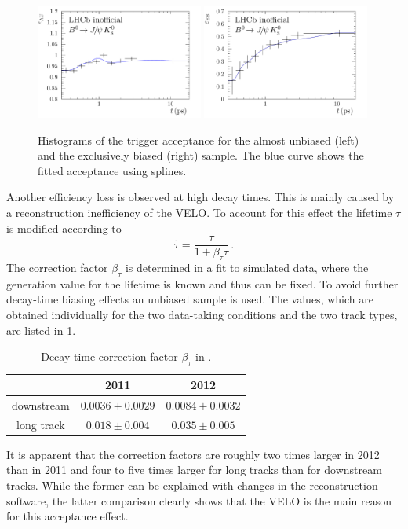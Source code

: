 \begin{figure}[htb]
\includegraphics[width=0.49\textwidth]{06-Bd2JpsiKS/tikz/pdf/Acceptancespline_zoomed_hlt2.pdf}
\includegraphics[width=0.49\textwidth]{06-Bd2JpsiKS/tikz/pdf/Acceptancespline_zoomed_hlt1.pdf}
\caption{Histograms of the trigger acceptance for the almost unbiased (left) and the
exclusively biased (right) sample. The blue curve shows the fitted acceptance
using splines.}
\label{fig:bd2jpsiks:decaytime:acceptance:splines}
\end{figure}

Another efficiency loss is observed at high decay times. This is mainly caused
by a reconstruction inefficiency of the VELO. To account for this effect the
lifetime $\tau$ is modified according to
\begin{equation}
  \widetilde{\tau} = \frac{\tau}{1 + \beta_\tau \tau}\,. 
\end{equation}
The correction factor $\beta_\tau$ is determined in a fit to simulated data,
where the generation value for the lifetime is known and thus can be fixed. To
avoid further decay-time biasing effects an unbiased sample is used. The
values, which are obtained individually for the two data-taking conditions and
the two track types, are listed in
\cref{tab:bd2jpsiks:decaytime:acceptance:beta}.
\begin{table}[htb]
	\centering
	\caption{Decay-time correction factor $\beta_\tau$ in \si{\invps}.}
	\begin{tabular}{ccc}
		\toprule
		 & 2011 & 2012 \\
		\midrule
		downstream & $0.0036\pm0.0029$ & $0.0084\pm0.0032$ \\
		long track & $0.018\pm0.004$   & $0.035\pm0.005$ \\
		\bottomrule
	\end{tabular}
	\label{tab:bd2jpsiks:decaytime:acceptance:beta}
\end{table}
It is apparent that the correction factors are roughly two times larger in
2012 than in 2011 and four to five times larger for long tracks than for
downstream tracks. While the former can be explained with changes in the
reconstruction software, the latter comparison clearly shows that the VELO is
the main reason for this acceptance effect.

